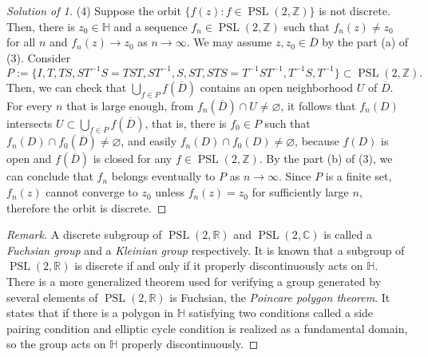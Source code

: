 \documentclass[a4paper]{article}
\theoremstyle{definition}
\renewcommand{\H}{\mathbb{H}}
\newcommand{\C}{\mathbb{C}}
\newcommand{\R}{\mathbb{R}}
\newcommand{\Z}{\mathbb{Z}}
\newcommand{\PSL}{\operatorname{PSL}}
\renewcommand{\bar}{\overline}
\begin{document}
\begin{proof}[Solution of 1]
(4)
Suppose the orbit $\{f(z):f\in\PSL(2,\Z)\}$ is not discrete.
Then, there is $z_0\in\H$ and a sequence $f_n\in\PSL(2,\Z)$ such that $f_n(z)\ne z_0$ for all $n$ and $f_n(z)\to z_0$ as $n\to\infty$.
We may assume $z,z_0\in\bar D$ by the part (a) of (3).
Consider
\[P:=\{I,T,TS,ST^{-1}S=TST,ST^{-1},S,ST,STS=T^{-1}ST^{-1},T^{-1}S,T^{-1}\}\subset\PSL(2,\Z).\]
Then, we can check that $\bigcup_{f\in P}f(\bar D)$ contains an open neighborhood $U$ of $\bar D$.
For every $n$ that is large enough, from $f_n(\bar D)\cap U\ne\varnothing$, it follows that $f_n(D)$ intersects $U\subset\bigcup_{f\in P}f(\bar D)$, that is, there is $f_0\in P$ such that $f_n(D)\cap f_0(\bar D)\ne\varnothing$, and easily $f_n(D)\cap f_0(D)\ne\varnothing$, because $f(D)$ is open and $f(\bar D)$ is closed for any $f\in\PSL(2,\Z)$.
By the part (b) of (3), we can conclude that $f_n$ belongs eventually to $P$ as $n\to\infty$.
Since $P$ is a finite set, $f_n(z)$ cannot converge to $z_0$ unless $f_n(z)=z_0$ for sufficiently large $n$, therefore the orbit is discrete.
\end{proof}

\begin{proof}[Remark]
A discrete subgroup of $\PSL(2,\R)$ and $\PSL(2,\C)$ is called a \emph{Fuchsian group} and a \emph{Kleinian group} respectively.
It is known that a subgroup of $\PSL(2,\R)$ is discrete if and only if it properly discontinuously acts on $\H$.
There is a more generalized theorem used for verifying a group generated by several elements of $\PSL(2,\R)$ is Fuchsian, the \emph{Poincare polygon theorem}.
It states that if there is a polygon in $\H$ satisfying two conditions called a side pairing condition and elliptic cycle condition is realized as a fundamental domain, so the group acts on $\H$ properly discontinuously.
\end{proof}
\end{document}
